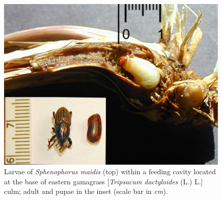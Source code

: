 \documentclass[agronomy,article,submit,moreauthors,pdftex,10pt,a4paper]{mdpi}
\theoremstyle{mdpi}
\newcounter{ex}
\newcounter{re}
\theoremstyle{mdpidefinition}
\begin{document}
\begin{figure}
  \includegraphics[width=450 pt]{bilbug.pdf}
  \caption{Larvae of \textit{Sphenophorus maidis} (top) within a feeding cavity located at the base of eastern gamagrass [\textit{Tripsacum dactyloides} (L.) L.] culm; adult and pupae in the inset (scale bar in \textit{cm}).}
  \label{fig:MB}
\end{figure}

\end{document}
